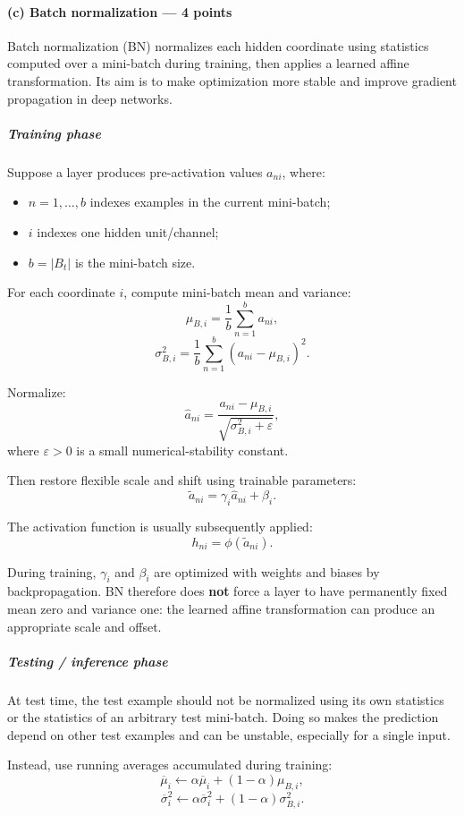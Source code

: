 \documentclass[11pt,a4paper]{article}
\theoremstyle{definition}
\begin{document}
\paragraph{(c) Batch normalization --- 4 points}

Batch normalization (BN) normalizes each hidden coordinate using statistics computed over a mini-batch during training, then applies a learned affine transformation. Its aim is to make optimization more stable and improve gradient propagation in deep networks.

\subparagraph{Training phase}

Suppose a layer produces pre-activation values $a_{ni}$, where:
\begin{itemize}
    \item $n=1,\ldots,b$ indexes examples in the current mini-batch;
    \item $i$ indexes one hidden unit/channel;
    \item $b=|B_t|$ is the mini-batch size.
\end{itemize}

For each coordinate $i$, compute mini-batch mean and variance:
\[
\mu_{B,i}
=
\frac{1}{b}\sum_{n=1}^{b}a_{ni},
\]
\[
\sigma^2_{B,i}
=
\frac{1}{b}\sum_{n=1}^{b}(a_{ni}-\mu_{B,i})^2.
\]

Normalize:
\[
\widehat{a}_{ni}
=
\frac{a_{ni}-\mu_{B,i}}
{\sqrt{\sigma^2_{B,i}+\varepsilon}},
\]
where $\varepsilon>0$ is a small numerical-stability constant.

Then restore flexible scale and shift using trainable parameters:
\[
\boxed{
\widetilde{a}_{ni}
=
\gamma_i\widehat{a}_{ni}+\beta_i.
}
\]

The activation function is usually subsequently applied:
\[
h_{ni}=\phi(\widetilde{a}_{ni}).
\]

During training, $\gamma_i$ and $\beta_i$ are optimized with weights and biases by backpropagation. BN therefore does \textbf{not} force a layer to have permanently fixed mean zero and variance one: the learned affine transformation can produce an appropriate scale and offset.

\subparagraph{Testing / inference phase}

At test time, the test example should not be normalized using its own statistics or the statistics of an arbitrary test mini-batch. Doing so makes the prediction depend on other test examples and can be unstable, especially for a single input.

Instead, use running averages accumulated during training:
\[
\overline{\mu}_i
\leftarrow
\alpha \overline{\mu}_i+(1-\alpha)\mu_{B,i},
\]
\[
\overline{\sigma}_i^2
\leftarrow
\alpha \overline{\sigma}_i^2
+
(1-\alpha)\sigma_{B,i}^2.
\]
\end{document}
